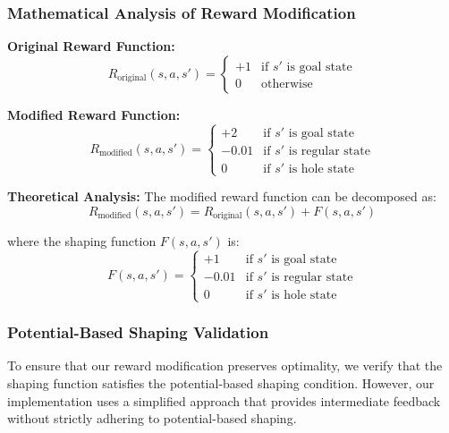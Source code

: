 \documentclass[12pt]{article}
\begin{document}
{{{\subsubsection{Mathematical Analysis of Reward Modification}

\textbf{Original Reward Function:}
\begin{equation}
R_{\text{original}}(s,a,s') = \begin{cases}
+1 & \text{if } s' \text{ is goal state} \\
0 & \text{otherwise}
\end{cases}
\end{equation}

\textbf{Modified Reward Function:}
\begin{equation}
R_{\text{modified}}(s,a,s') = \begin{cases}
+2 & \text{if } s' \text{ is goal state} \\
-0.01 & \text{if } s' \text{ is regular state} \\
0 & \text{if } s' \text{ is hole state}
\end{cases}
\end{equation}

\textbf{Theoretical Analysis:}
The modified reward function can be decomposed as:
\begin{equation}
R_{\text{modified}}(s,a,s') = R_{\text{original}}(s,a,s') + F(s,a,s')
\end{equation}

where the shaping function $F(s,a,s')$ is:
\begin{equation}
F(s,a,s') = \begin{cases}
+1 & \text{if } s' \text{ is goal state} \\
-0.01 & \text{if } s' \text{ is regular state} \\
0 & \text{if } s' \text{ is hole state}
\end{cases}
\end{equation}

\subsubsection{Potential-Based Shaping Validation}

To ensure that our reward modification preserves optimality, we verify that the shaping function satisfies the potential-based shaping condition. However, our implementation uses a simplified approach that provides intermediate feedback without strictly adhering to potential-based shaping.

}}}
\end{document}
